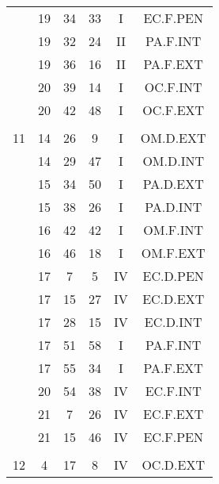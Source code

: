 \documentclass[12pt, a4paper]{article}
\begin{document}
\begin{multicols}{3}
{\begin{tabular}{c c c c c c}
	 	 	 	 & 19 & 34 & 33 & I & EC.F.PEN\\%
	 	 	 	 & 19 & 32 & 24 & II & PA.F.INT\\%
	 	 	 	 & 19 & 36 & 16 & II & PA.F.EXT\\%
	 	 	 	 & 20 & 39 & 14 & I & OC.F.INT\\%
	 	 	 	 & 20 & 42 & 48 & I & OC.F.EXT\\%
	 	 	 	 & & & & & \\%
	 	 	 	11 & 14 & 26 & 9 & I & OM.D.EXT\\%
	 	 	 	 & 14 & 29 & 47 & I & OM.D.INT\\%
	 	 	 	 & 15 & 34 & 50 & I & PA.D.EXT\\%
	 	 	 	 & 15 & 38 & 26 & I & PA.D.INT\\%
	 	 	 	 & 16 & 42 & 42 & I & OM.F.INT\\%
	 	 	 	 & 16 & 46 & 18 & I & OM.F.EXT\\%
	 	 	 	 & 17 & 7 & 5 & IV & EC.D.PEN\\%
	 	 	 	 & 17 & 15 & 27 & IV & EC.D.EXT\\%
	 	 	 	 & 17 & 28 & 15 & IV & EC.D.INT\\%
	 	 	 	 & 17 & 51 & 58 & I & PA.F.INT\\%
	 	 	 	 & 17 & 55 & 34 & I & PA.F.EXT\\%
	 	 	 	 & 20 & 54 & 38 & IV & EC.F.INT\\%
	 	 	 	 & 21 & 7 & 26 & IV & EC.F.EXT\\%
	 	 	 	 & 21 & 15 & 46 & IV & EC.F.PEN\\%
	 	 	 	 & & & & & \\%
	 	 	 	12 & 4 & 17 & 8 & IV & OC.D.EXT\\%
	 	 \end{tabular}
 	}
\end{multicols}
\end{document}
